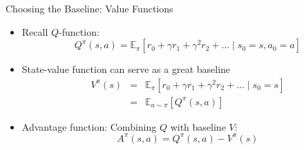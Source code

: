 \documentclass[aspectratio=169]{../latex_main/tntbeamer}  %
\begin{document}
\begin{frame}[c]{Choosing the Baseline: Value Functions}
	
	\begin{itemize}
		\item Recall $Q$-function:
		$$Q^\pi(s,a) = \mathbb{E}_\pi [r_0 +  \gamma r_1 + \gamma^2 r_2 + \ldots \mid s_0 = s, a_0 = a ]$$
		\item State-value function can serve as a great baseline
		\begin{eqnarray}
		V^\pi (s) &=& \mathbb{E}_\pi [r_0 +  \gamma r_1 + \gamma^2 r_2 + \ldots \mid s_0 = s]\nonumber\\	
		&=& \mathbb{E}_{a\sim\pi} [Q^\pi(s,a)]\nonumber
		\end{eqnarray}
		\item Advantage function: Combining $Q$ with baseline $V$:
		$$A^\pi(s,a) = Q^\pi(s,a) - V^\pi(s) $$
	\end{itemize}
	
\end{frame}
\end{document}
